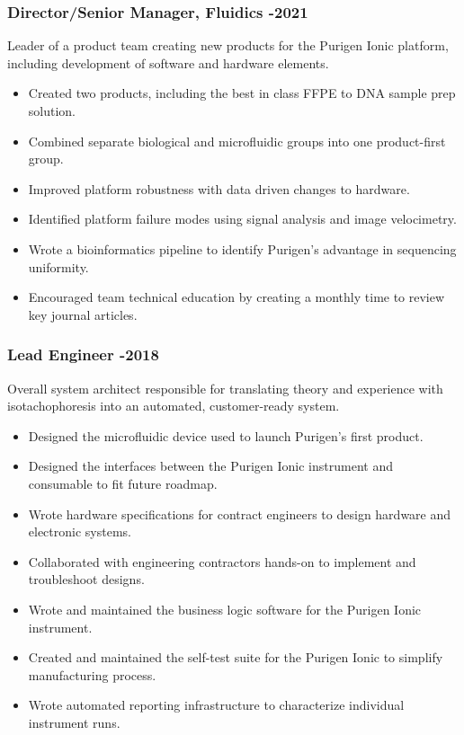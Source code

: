 \documentclass{res}
\begin{document}
\begin{resume}
    \subsubsection{Director/Senior Manager, Fluidics -2021}
      \vspace{-0.2in}
      Leader of a product team creating new products for the Purigen Ionic platform,
      including development of software and hardware elements.
      \vspace{0.1in}
       \begin{itemize}
        \item Created two products, including the best in class FFPE to DNA sample prep solution.
        \item Combined separate biological and microfluidic groups into one product-first group.
        \item Improved platform robustness with data driven changes to hardware.
        \item Identified platform failure modes using signal analysis and image velocimetry.
        \item Wrote a bioinformatics pipeline to identify Purigen's advantage in sequencing uniformity.
        \item Encouraged team technical education by creating a monthly time to review key journal articles. 
       \end{itemize}


      \vspace{-0.2in}
    \subsubsection{Lead Engineer -2018}
      \vspace{-0.2in}
      Overall system architect responsible for translating theory and experience with isotachophoresis
      into an automated, customer-ready system.
      \vspace{0.1in}
      \begin{itemize}
        \item Designed the microfluidic device used to launch Purigen's first product.
        \item Designed the interfaces between the Purigen Ionic instrument and consumable to fit future roadmap.
        \item Wrote hardware specifications for contract engineers to design hardware and electronic systems.
        \item Collaborated with engineering contractors hands-on to implement and troubleshoot designs.
        \item Wrote and maintained the business logic software for the Purigen Ionic instrument.
        \item Created and maintained the self-test suite for the Purigen Ionic to simplify manufacturing process.
        \item Wrote automated reporting infrastructure to characterize individual instrument runs.
      \end{itemize}


\end{resume}
\end{document}
